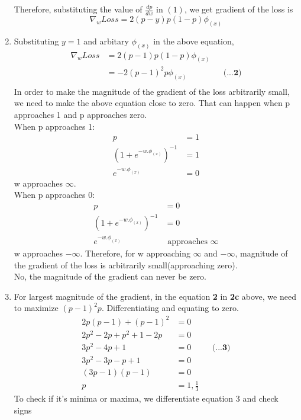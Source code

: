 \documentclass[12pt]{article}
\begin{document}
\begin{enumerate}[label=(\alph*)]
  Therefore, substituting the value of $\frac{dp}{dw}$ in $(1)$, we get gradient of the loss is $$\nabla_w Loss = 2(p-y)p(1-p)\phi_{(x)}$$
  \item Substituting $y=1$ and arbitary $\phi_{(x)}$ in the above equation,
  \begin{align*}
  \nabla_w Loss &= 2 (p-1) p (1-p) \phi_{(x)} \\
  &= -2 (p-1)^2 p \phi_{(x)} && \textbf{(...2)} \\
  \end{align*}
  In order to make the magnitude of the gradient of the loss arbitrarily small, we need to make the above equation close to zero. That can happen when p approaches 1 and p approaches zero. \\
  When p approaches 1: \\
  \begin{align*}
  p &= 1 \\
  (1 + e^{-w.\phi_{(x)}})^{-1} &= 1  \\
  e^{-w.\phi_{(x)}} &= 0
  \end{align*}
  w approaches $\infty$. \\
  When p approaches 0: \\
  \begin{align*}
   p &= 0 \\
  (1 + e^{-w.\phi_{(x)}})^{-1} &= 0  \\
  e^{-w.\phi_{(x)}} &\text{ approaches } \infty
  \end{align*}
  w approaches $-\infty$.
  Therefore, for w approaching $\infty$ and $-\infty$, magnitude of the gradient of the loss is arbitrarily small(approaching zero).\\
  No, the magnitude of the gradient can never be zero.
  \item For largest magnitude of the gradient, in the equation \textbf{2} in \textbf{2c} above, we need to maximize $(p-1)^2p$. Differentiating and equating to zero.
  \begin{align*}
  2p(p-1) + (p-1)^2 &= 0 \\
  2p^2 - 2p + p^2 + 1 -2p &= 0 \\
  3p^2 -4p +1 &= 0 && \textbf{(...3)} \\
  3p^2 -3p -p +1 &= 0 \\
  (3p - 1) (p - 1) &= 0 \\
  p &= 1, \frac{1}{3}
  \end{align*}
 To check if it's minima or maxima, we differentiate equation 3 and check signs \\

\end{enumerate}
\end{document}
